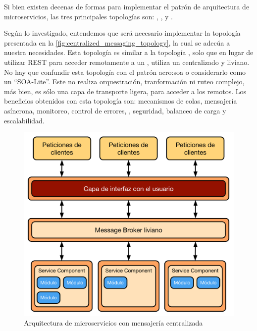 Si bien existen decenas de formas para implementar el patrón de arquitectura de microservicios, las tres principales topologías son: , , y .\cite[p.~29]{markrichards2015}

Según lo investigado, entendemos que será necesario implementar la topología  presentada en la \autoref{fig:centralized_messaging_topology}, la cual se adecúa a nuestra necesidades.  Esta topología es similar a la topología , solo que en lugar de utilizar REST para acceder remotamente a un , utiliza un  centralizado y liviano.  No hay que confundir esta topología con el patrón \gls{acro:soa} o considerarlo como un ``SOA-Lite''.  Este  no realiza orquestración, tranformación ni ruteo complejo, más bien, es sólo una capa de transporte ligera, para acceder a los  remotos.  Los beneficios obtenidos con esta topología son: mecanismos de colas, mensajería asíncrona, monitoreo, control de errores, , seguridad, balanceo de carga y escalabilidad.

\begin{figure}[H]
  \includegraphics[width=\linewidth]{src/images/02-capitulo-2/arquitectura-mensajeria-centralizada.png}
  \caption{Arquitectura de microservicios con mensajería centralizada}
  \label{fig:centralized_messaging_topology}
\end{figure}

